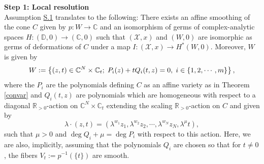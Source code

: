 \documentclass[a4paper,11pt]{article}
\def\C{\mathbb{C}}
\def\R{\mathbb{R}}
\begin{document}
\textbf{Step 1: Local resolution}\\

Assumption \hyperlink{S.1}{S.1} translates to the following: There exists an affine smoothing of the cone $C$ given by $p : W \rightarrow \C$ and an isomorphism of germs of complex-analytic spaces $H : (\mathbb{D}, 0) \rightarrow  (\C,0)$ such that $(\mathcal{X}, x)$ and $(W,0)$ are isomorphic as germs of deformations of $C$ under a map  $I : (\mathcal{X}, x) \rightarrow  H^*(W,0)$. Moreover, $W$ is given by 
$$
W := \left\{ (z,t) \in \C^N \times \C_t ; \hspace{0.1cm} P_i(z) + t Q_i(t, z) =0, \hspace{0.1cm} i \in \{ 1,2, \cdots, m\}  \right\}, 
$$
where the $P_i$ are the polynomials defining $C$ as an affine variety as in Theorem \ref{convar} and $Q_i(t, z)$ are polynomials which are homogeneous with respect to a diagonal $\R_{>0}$-action on $\C^N \times \C_t$ extending the scaling $\R_{>0}$-action on $C$ and given by 
$$\lambda \cdot (z, t) = (\lambda^{w_1} z_1, \lambda^{w_2} z_2, \cdots, \lambda^{w_N} z_N, \lambda^{\mu} t ),$$ 
such that $\mu >0$ and $\deg Q_i + \mu = \deg P_i$ with respect to this action. Here, we are also, implicitly, assuming that the polynomials $Q_i$ are chosen so that for $t \neq 0$, the fibers $V_t := p^{-1}(\{ t\})$ are smooth.\\
\end{document}
